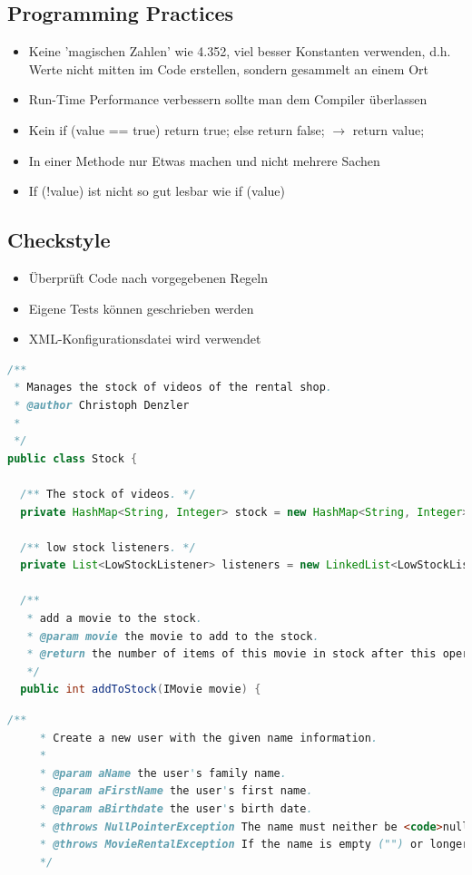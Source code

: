 \documentclass[a4paper,10pt]{article}
\begin{document}
\subsection{Programming Practices}
\begin{itemize}
\item Keine 'magischen Zahlen' wie 4.352, viel besser Konstanten verwenden, d.h. Werte nicht mitten im Code erstellen, sondern gesammelt an einem Ort
\item Run-Time Performance verbessern sollte man dem Compiler überlassen
\item Kein if (value == true) { return true; } else { return false; } $\to$ return value;
\item In einer Methode nur Etwas machen und nicht mehrere Sachen
\item If (!value) ist nicht so gut lesbar wie if (value)
\end{itemize}

\subsection{Checkstyle}
\begin{itemize}
\item Überprüft Code nach vorgegebenen Regeln
\item Eigene Tests können geschrieben werden
\item XML-Konfigurationsdatei wird verwendet
\end{itemize}

\begin{lstlisting}[language=Java,caption=JavaDoc Beispiel 1, style=MyJavaStyle]
/**
 * Manages the stock of videos of the rental shop.
 * @author Christoph Denzler
 *
 */
public class Stock {
  
  /** The stock of videos. */
  private HashMap<String, Integer> stock = new HashMap<String, Integer>();
  
  /** low stock listeners. */
  private List<LowStockListener> listeners = new LinkedList<LowStockListener>();
  
  /**
   * add a movie to the stock.
   * @param movie the movie to add to the stock.
   * @return the number of items of this movie in stock after this operation.
   */
  public int addToStock(IMovie movie) {
\end{lstlisting}

\begin{lstlisting}[language=Java,caption=JavaDoc Beispiel 2, style=MyJavaStyle]
    /**
     * Create a new user with the given name information.
     * 
     * @param aName the user's family name.
     * @param aFirstName the user's first name.
     * @param aBirthdate the user's birth date.
     * @throws NullPointerException The name must neither be <code>null</code>.
     * @throws MovieRentalException If the name is empty ("") or longer than 40 characters.
     */
\end{lstlisting}
\end{document}
